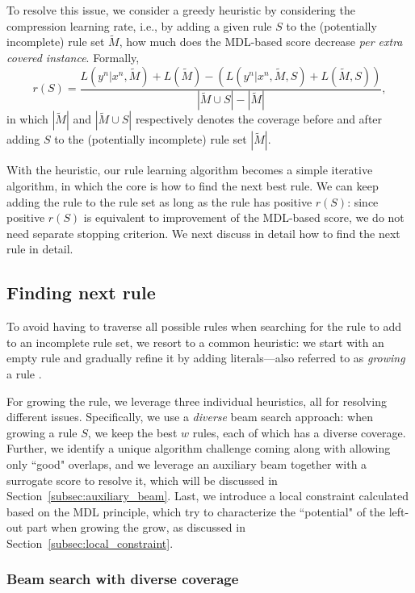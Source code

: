 To resolve this issue, we consider a greedy heuristic by considering the compression learning rate, i.e., by adding a given rule $S$ to the (potentially incomplete) rule set $\tilde{M}$, how much does the MDL-based score decrease \emph{per extra covered instance}. Formally, 
\begin{equation} \label{eq:learning_rate}
	r(S) = \frac{L(y^n|x^n, \tilde{M}) + L(\tilde{M}) - \left(L(y^n|x^n, \tilde{M}, S) + L(\tilde{M}, S) \right)}{|\tilde{M} \cup S| - |\tilde{M}|}, 
\end{equation}
in which $|\tilde{M}|$ and $|\tilde{M} \cup S|$ respectively denotes the coverage before and after adding $S$ to the (potentially incomplete) rule set $|\tilde{M}|$. 

With the heuristic, our rule learning algorithm becomes a simple iterative algorithm, in which the core is how to find the next best rule. We can keep adding the rule to the rule set as long as the rule has positive $r(S)$: since positive $r(S)$ is equivalent to improvement of the MDL-based score, we do not need separate stopping criterion. We next discuss in detail how to find the next rule in detail. 

\subsection{Finding next rule}
To avoid having to traverse all possible rules when searching for the rule to add to an incomplete rule set, we resort to a common heuristic: we start with an empty rule and gradually refine it by adding literals---also referred to as \emph{growing} a rule \citep{furnkranz2012foundations}. 

For growing the rule, we leverage three individual heuristics, all for resolving different issues. Specifically, we use a \emph{diverse} beam search approach: when growing a rule $S$, we keep the best $w$ rules, each of which has a diverse coverage. 
 Further, we identify a unique algorithm challenge coming along with allowing only ``good" overlaps, and we leverage an auxiliary beam together with a surrogate score to resolve it, which will be discussed in Section~\ref{subsec:auxiliary_beam}. 
 Last, we introduce a local constraint calculated based on the MDL principle, which try to characterize the ``potential" of the left-out part when growing the grow, as discussed in Section~\ref{subsec:local_constraint}. 
 
\subsubsection{Beam search with diverse coverage} \label{subsec:diverse_beam_search}

